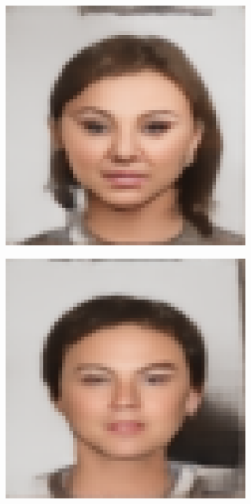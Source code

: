 \documentclass{IEEEcsmag}
\begin{document}
\begin{figure}[ht]
\begin{subfigure}{0.12\textwidth}
    \end{subfigure}
    \begin{subfigure}{0.12\textwidth}
        \includegraphics[width=\linewidth]{CUHK_Student/generated_images/f1-008-01-sz1.jpg_AE_UNET.png}
    \end{subfigure}
    \begin{subfigure}{0.12\textwidth}
        \includegraphics[width=\linewidth]{CUHK_Student/generated_images/M2-018-01-sz1.jpg_AE_UNET.png}
    \end{subfigure}
    

\end{figure}
\end{document}
